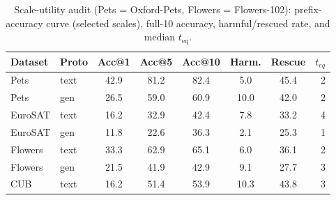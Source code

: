 \begin{table}[t]
\centering
\caption{Scale-utility audit (Pets = Oxford-Pets, Flowers = Flowers-102): prefix-accuracy curve (selected scales), full-10 accuracy, harmful/rescued rate, and median $t_{\mathrm{eq}}$.}
\label{tab:audit}
\small
\setlength{\tabcolsep}{2.5pt}
\begin{tabular}{llcccccr}
\hline
Dataset & Proto & Acc@1 & Acc@5 & Acc@10 & Harm. & Rescue & $t_{eq}$ \\
\hline
Pets & text & 42.9 & 81.2 & 82.4 & 5.0 & 45.4 & 2 \\
Pets & gen & 26.5 & 59.0 & 60.9 & 10.0 & 42.0 & 2 \\
EuroSAT & text & 16.2 & 32.9 & 42.4 & 7.8 & 33.2 & 4 \\
EuroSAT & gen & 11.8 & 22.6 & 36.3 & 2.1 & 25.3 & 1 \\
Flowers & text & 33.3 & 62.9 & 65.1 & 6.0 & 36.1 & 2 \\
Flowers & gen & 21.5 & 41.9 & 42.9 & 9.1 & 27.7 & 3 \\
CUB & text & 16.2 & 51.4 & 53.9 & 10.3 & 43.8 & 3 \\
\hline
\end{tabular}
\end{table}
